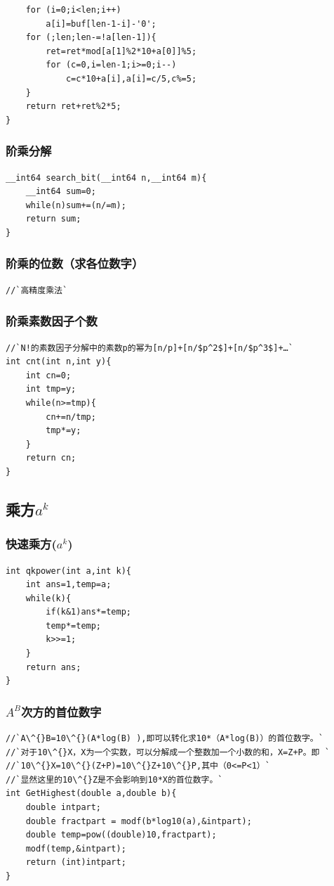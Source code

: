 \documentclass[a4paper]{article}
\begin{document}
\begin{CJK*}{UTF8}{gbsn}
\begin{multicols}{3}
\begin{flushleft}
\begin{lstlisting}
    for (i=0;i<len;i++) 
        a[i]=buf[len-1-i]-'0'; 
    for (;len;len-=!a[len-1]){ 
        ret=ret*mod[a[1]%2*10+a[0]]%5; 
        for (c=0,i=len-1;i>=0;i--) 
            c=c*10+a[i],a[i]=c/5,c%=5; 
    } 
    return ret+ret%2*5; 
}
\end{lstlisting}


\subsubsection{阶乘分解}
\begin{lstlisting}
__int64 search_bit(__int64 n,__int64 m){
	__int64 sum=0;
	while(n)sum+=(n/=m);
	return sum;
}
\end{lstlisting}


\subsubsection{阶乘的位数（求各位数字）}
\begin{lstlisting}
//`高精度乘法`
\end{lstlisting}


\subsubsection{阶乘素数因子个数}
\begin{lstlisting}
//`N!的素数因子分解中的素数p的幂为[n/p]+[n/$p^2$]+[n/$p^3$]+…`
int cnt(int n,int y){
    int cn=0;
    int tmp=y;
    while(n>=tmp){
        cn+=n/tmp;
        tmp*=y;
    }
    return cn;
}
\end{lstlisting}

\subsection{乘方$a^k$}

\subsubsection{快速乘方($a^k$)}
\begin{lstlisting}
int qkpower(int a,int k){
	int ans=1,temp=a;
	while(k){
		if(k&1)ans*=temp;
		temp*=temp;
		k>>=1; 
	} 
	return ans; 
} 
\end{lstlisting}


\subsubsection{$A^B$次方的首位数字}
\begin{lstlisting}
//`A\^{}B=10\^{}(A*log(B) ),即可以转化求10*（A*log(B)）的首位数字。`
//`对于10\^{}X，X为一个实数，可以分解成一个整数加一个小数的和，X=Z+P。即 `
//`10\^{}X=10\^{}(Z+P)=10\^{}Z+10\^{}P,其中（0<=P<1）`
//`显然这里的10\^{}Z是不会影响到10*X的首位数字。`
int GetHighest(double a,double b){
    double intpart;
    double fractpart = modf(b*log10(a),&intpart);
    double temp=pow((double)10,fractpart);
    modf(temp,&intpart);
    return (int)intpart;  
}
\end{lstlisting}




\end{flushleft}
\end{multicols}
\end{CJK*}
\end{document}
